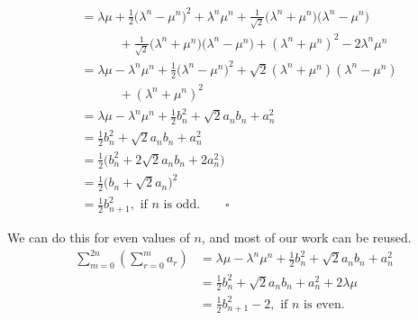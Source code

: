 \documentclass[a4paper]{article}
\begin{document}
\begin{align*}
                                                    & = \lambda\mu + \frac{1}{2} \bigg(\lambda^n - \mu^n \bigg)^2 + \lambda^n\mu^n + \frac{1}{\sqrt{2}} \bigg(\lambda^n + \mu^n \bigg) \bigg(\lambda^n - \mu^n \bigg)                                \\
                                                    & \phantom{++}\quad + \frac{1}{\sqrt{2}} \bigg(\lambda^n + \mu^n \bigg) \bigg(\lambda^n - \mu^n \bigg) + (\lambda^n + \mu^n)^2 - 2\lambda^n\mu^n                                                 \\
                                                    & = \lambda\mu - \lambda^n\mu^n + \frac{1}{2} \bigg(\lambda^n - \mu^n \bigg)^2 + \sqrt{2} (\lambda^n + \mu^n)(\lambda^n - \mu^n)                                                                 \\
                                                    & \phantom{++}\quad + (\lambda^n + \mu^n)^2                                                                                                                                                      \\
                                                    & = \lambda\mu - \lambda^n\mu^n + \frac{1}{2} b^2_n + \sqrt{2} a_n b_n + a^2_n                                                                                                                   \\
                                                    & = \frac{1}{2} b^2_n + \sqrt{2} a_n b_n + a^2_n                                                                                                                                                 \\
                                                    & = \frac{1}{2} \bigg(b^2_n + 2\sqrt{2} a_n b_n + 2a^2_n \bigg)                                                                                                                                  \\
                                                    & = \frac{1}{2} \bigg(b_n + \sqrt{2} a_n \bigg)^2                                                                                                                                                \\
                                                    & = \frac{1}{2} b^2_{n+1}, \text{ if $n$ is odd}. \qquad \square
\end{align*}

We can do this for even values of $n$, and most of our work can be reused.
\begin{align*}
    \sum_{m=0}^{2n} \left(\sum_{r=0}^{m} a_r\right) & = \lambda\mu - \lambda^n\mu^n + \frac{1}{2} b^2_n + \sqrt{2} a_n b_n + a^2_n \\
                                                    & = \frac{1}{2} b^2_n + \sqrt{2} a_n b_n + a^2_n + 2\lambda\mu                 \\
                                                    & = \frac{1}{2} b^2_{n+1} - 2, \text{ if $n$ is even}.
\end{align*}
\end{document}

